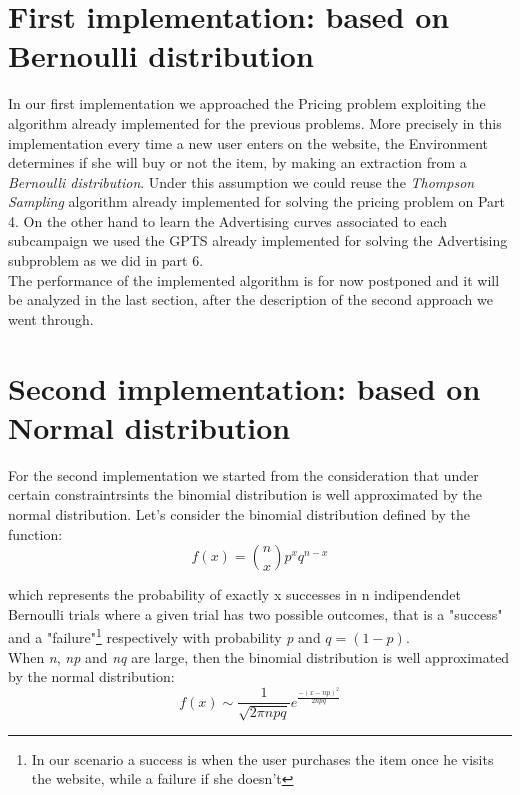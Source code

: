 \section{First implementation: based on Bernoulli distribution}
In our first implementation we approached the Pricing problem exploiting the algorithm already implemented for the previous problems. More precisely in this implementation every time a new user enters on the website, the Environment determines if she will buy or not the item, by making an extraction from a \textit{Bernoulli distribution}. Under this assumption we could reuse the \textit{Thompson Sampling} algorithm already implemented for solving the pricing problem on Part 4.
On the other hand to learn the Advertising curves associated to each subcampaign we used the GPTS already implemented for solving the Advertising subproblem as we did in part 6.\\ The performance of the implemented algorithm is for now postponed and it will be analyzed in the last section, after the description of the second approach we went through.


\section{Second implementation: based on Normal distribution}
For the second implementation we started from the consideration that under certain constraintrsints the binomial distribution is well approximated by the normal distribution. Let's consider the binomial distribution defined by the function:
\begin{equation}
    f(x) = \binom{n}{x}  p^x q^{n-x}
\end{equation}

which represents the probability of exactly x successes in n indipendendet Bernoulli trials where a given trial has two possible outcomes, that is a "success" and a "failure"\footnote{In our scenario a success is when the user purchases the item once he visits the website, while a failure if she doesn't} respectively with probability \textit{p} and $q=(1-p)$.\\ When \textit{n}, \textit{np} and \textit{nq} are large, then the binomial distribution is well approximated by the normal distribution:
\begin{equation}
    f(x)  \sim \frac{1}{\sqrt{2 \pi npq}} e^{ \frac{-(x-np)^2}{2npq} }
\end{equation}

